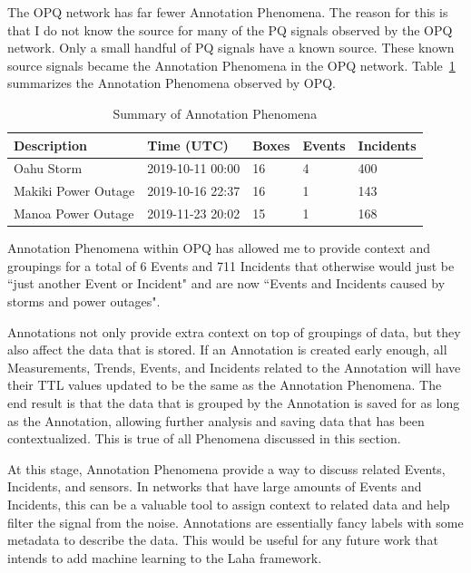 The OPQ network has far fewer Annotation Phenomena. The reason for this is that I do not know the source for many of the PQ signals observed by the OPQ network. Only a small handful of PQ signals have a known source. These known source signals became the Annotation Phenomena in the OPQ network. Table~\ref{table:annotation_summary} summarizes the Annotation Phenomena observed by OPQ.

\begin{table}[H]
    \centering
    \caption{Summary of Annotation Phenomena}
    \begin{tabularx}{\textwidth}{lllll}
        \toprule
        \textbf{Description} & \textbf{Time (UTC)} & \textbf{Boxes} & \textbf{Events} & \textbf{Incidents}  \\
        \midrule
        Oahu Storm & 2019-10-11 00:00 & 16 & 4 & 400 \\
        Makiki Power Outage & 2019-10-16 22:37 & 16 & 1 & 143 \\
        Manoa Power Outage & 2019-11-23 20:02 & 15 & 1 & 168 \\
        \bottomrule
    \end{tabularx}
    \label{table:annotation_summary}
\end{table}

Annotation Phenomena within OPQ has allowed me to provide context and groupings for a total of 6 Events and 711 Incidents that otherwise would just be ``just another Event or Incident" and are now ``Events and Incidents caused by storms and power outages".

Annotations not only provide extra context on top of groupings of data, but they also affect the data that is stored. If an Annotation is created early enough, all Measurements, Trends, Events, and Incidents related to the Annotation will have their TTL values updated to be the same as the Annotation Phenomena. The end result is that the data that is grouped by the Annotation is saved for as long as the Annotation, allowing further analysis and saving data that has been contextualized. This is true of all Phenomena discussed in this section.

At this stage, Annotation Phenomena provide a way to discuss related Events, Incidents, and sensors. In networks that have large amounts of Events and Incidents, this can be a valuable tool to assign context to related data and help filter the signal from the noise. Annotations are essentially fancy labels with some metadata to describe the data. This would be useful for any future work that intends to add machine learning to the Laha framework.

